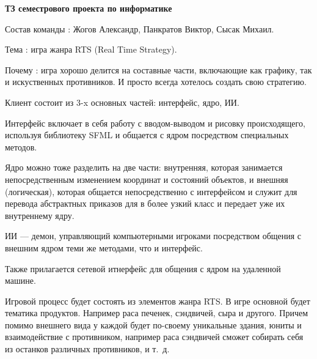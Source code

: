 \documentclass[a4paper]{article}
\begin{document}
\begin{center}
\Large\textbf{ТЗ семестрового проекта по информатике}
\end{center}

Состав команды : Жогов Александр, Панкратов Виктор, Сысак Михаил.

Тема : игра жанра RTS (Real Time Strategy).

Почему : игра хорошо делится на составные части, включающие как графику, так и искуственных противников. И просто всегда хотелось создать свою стратегию.

Клиент состоит из $3$-x основных частей: интерфейс, ядро, ИИ.

Интерфейс включает в себя работу с вводом-выводом и рисовку происходящего, используя библиотеку SFML и общается с ядром посредством специальных методов.

Ядро можно тоже разделить на две части: внутренняя, которая занимается непосредственным изменением координат и состояний объектов, и внешняя (логическая), которая общается непосредственно с интерфейсом и служит для перевода абстрактных приказов для в более узкий класс и передает уже их внутреннему ядру.

ИИ --- демон, управляющий компьютерными игроками посредством общения с внешним ядром теми же методами, что и интерфейс.

Также прилагается сетевой итнерфейс для общения с ядром на удаленной машине.

Игровой процесс будет состоять из элементов жанра RTS. В игре основной будет тематика продуктов. Например раса печенек, сэндвичей, сыра и другого. Причем помимо внешнего вида у каждой будет по-своему уникальные здания, юниты и взаимодействие с противником, например раса сэндвичей сможет собирать себя из останков различных противников, и т.~д.




 
\end{document}
